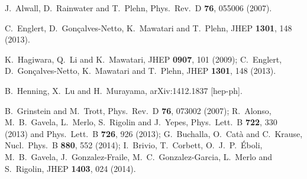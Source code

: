 
  J.~Alwall, D.~Rainwater and T.~Plehn,
  Phys.\ Rev.\ D {\bf 76}, 055006 (2007).

  C.~Englert, D.~Gon\c{c}alves-Netto, K.~Mawatari and T.~Plehn,
  JHEP {\bf 1301}, 148 (2013).

  K.~Hagiwara, Q.~Li and K.~Mawatari,
  JHEP {\bf 0907}, 101 (2009);
  C.~Englert, D.~Gon\c{c}alves-Netto, K.~Mawatari and T.~Plehn,
  JHEP {\bf 1301}, 148 (2013).
  

  B.~Henning, X.~Lu and H.~Murayama,
  arXiv:1412.1837 [hep-ph].
  
  B.~Grinstein and M.~Trott,
  Phys.\ Rev.\ D {\bf 76}, 073002 (2007);
  R.~Alonso, M.~B.~Gavela, L.~Merlo, S.~Rigolin and J.~Yepes,
  Phys.\ Lett.\ B {\bf 722}, 330 (2013) and 
  Phys.\ Lett.\ B {\bf 726}, 926 (2013);
  G.~Buchalla, O.~Cat\`a and C.~Krause,
  Nucl.\ Phys.\ B {\bf 880}, 552 (2014);
  I.~Brivio, T.~Corbett, O.~J.~P.~\'Eboli, M.~B.~Gavela, J.~Gonzalez-Fraile, M.~C.~Gonzalez-Garcia, L.~Merlo and S.~Rigolin,
  JHEP {\bf 1403}, 024 (2014).


